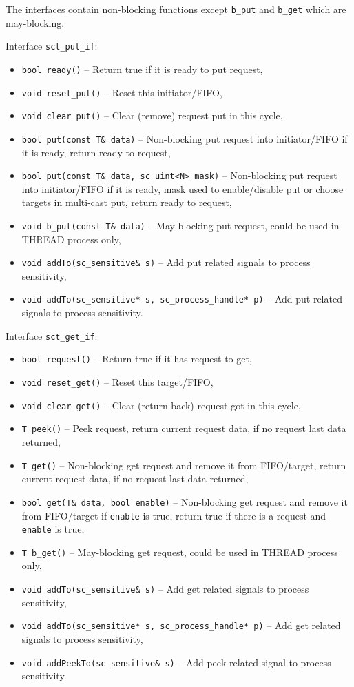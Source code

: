 The interfaces contain non-blocking functions except {\tt b\_put} and {\tt b\_get} which are may-blocking.

Interface {\tt sct\_put\_if}:
\begin{itemize}
\item {\tt bool ready()} -- Return true if it is ready to put request,
\item {\tt void reset\_put()} -- Reset this initiator/FIFO, 
\item {\tt void clear\_put()} -- Clear (remove) request put in this cycle,
\item {\tt bool put(const T\& data)} -- Non-blocking put request into initiator/FIFO if it is ready, return ready to request, 
\item {\tt bool put(const T\& data, sc\_uint<N> mask)} -- Non-blocking put request into initiator/FIFO if it is ready, mask  used to enable/disable put or choose targets in multi-cast put, return ready to request, 
\item {\tt void b\_put(const T\& data)} -- May-blocking put request, could be used in THREAD process only,
\item {\tt void addTo(sc\_sensitive\& s)} -- Add put related signals to process sensitivity,
\item {\tt void addTo(sc\_sensitive* s, sc\_process\_handle* p)} -- Add put related signals to process sensitivity.
\end{itemize}

Interface {\tt sct\_get\_if}:
\begin{itemize}
\item {\tt bool request()} -- Return true if it has request to get,
\item {\tt void reset\_get()} -- Reset this target/FIFO,
\item {\tt void clear\_get()} -- Clear (return back) request got in this cycle,
\item {\tt T peek()} -- Peek request, return current request data, if no request last data returned,
\item {\tt T get()} -- Non-blocking get request and remove it from FIFO/target, return current request data, if no request last data returned,
\item {\tt bool get(T\& data, bool enable)} -- Non-blocking get request and remove it from FIFO/target if {\tt enable} is true, return true if there is a request and {\tt enable} is true,
\item {\tt T b\_get()} -- May-blocking get request, could be used in THREAD process only,
\item {\tt void addTo(sc\_sensitive\& s)} -- Add get related signals to process sensitivity,
\item {\tt void addTo(sc\_sensitive* s, sc\_process\_handle* p)} -- Add get related signals to process sensitivity,
\item {\tt void addPeekTo(sc\_sensitive\& s)} -- Add peek related signal to process sensitivity.
\end{itemize}

